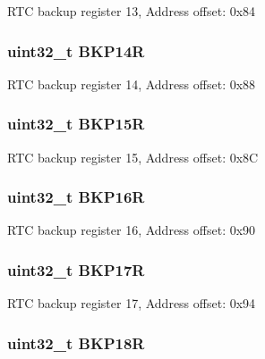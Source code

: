 R\-T\-C backup register 13, Address offset\-: 0x84 \hypertarget{struct_r_t_c___type_def_ac60f13e6619724747e61cfbff55b9fab}{
\subsubsection[{B\-K\-P14\-R}]{ uint32\-\_\-t B\-K\-P14\-R}}\label{struct_r_t_c___type_def_ac60f13e6619724747e61cfbff55b9fab}
R\-T\-C backup register 14, Address offset\-: 0x88 \hypertarget{struct_r_t_c___type_def_afafaddc3a983eb71332b7526d82191ad}{
\subsubsection[{B\-K\-P15\-R}]{ uint32\-\_\-t B\-K\-P15\-R}}\label{struct_r_t_c___type_def_afafaddc3a983eb71332b7526d82191ad}
R\-T\-C backup register 15, Address offset\-: 0x8\-C \hypertarget{struct_r_t_c___type_def_ad2f2eb2fb4b93e21515b10e920e719b6}{
\subsubsection[{B\-K\-P16\-R}]{ uint32\-\_\-t B\-K\-P16\-R}}\label{struct_r_t_c___type_def_ad2f2eb2fb4b93e21515b10e920e719b6}
R\-T\-C backup register 16, Address offset\-: 0x90 \hypertarget{struct_r_t_c___type_def_a2842aa523df62f3508316eb3b2e08f4e}{
\subsubsection[{B\-K\-P17\-R}]{ uint32\-\_\-t B\-K\-P17\-R}}\label{struct_r_t_c___type_def_a2842aa523df62f3508316eb3b2e08f4e}
R\-T\-C backup register 17, Address offset\-: 0x94 \hypertarget{struct_r_t_c___type_def_a640ccb2ccfb6316b88c070362dc29339}{
\subsubsection[{B\-K\-P18\-R}]{ uint32\-\_\-t B\-K\-P18\-R}}\label{struct_r_t_c___type_def_a640ccb2ccfb6316b88c070362dc29339}
